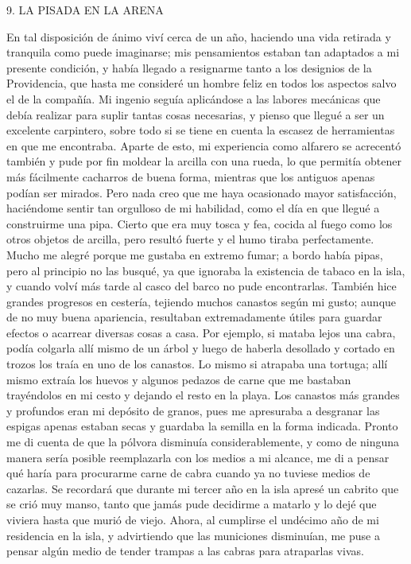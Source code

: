\documentclass{novela}
\begin{document}
    9. LA PISADA EN LA ARENA




    En tal disposición de ánimo viví cerca de un año, haciendo una vida retirada y tranquila como puede imaginarse; mis pensamientos estaban tan adaptados a mi presente condición, y había llegado a resignarme tanto a los designios de la Providencia, que hasta me consideré un hombre feliz en todos los aspectos salvo el de la compañía.
    Mi ingenio seguía aplicándose a las labores mecánicas que debía realizar para suplir tantas cosas necesarias, y pienso que llegué a ser un excelente carpintero, sobre todo si se tiene en cuenta la escasez de herramientas en que me encontraba. Aparte de esto, mi experiencia como alfarero se acrecentó también y pude por fin moldear la arcilla con una rueda, lo que permitía obtener más fácilmente cacharros de buena forma, mientras que los antiguos apenas podían ser mirados. Pero nada creo que me haya ocasionado mayor satisfacción, haciéndome sentir tan orgulloso de mi habilidad, como el día en que llegué a construirme una pipa. Cierto que era muy tosca y fea, cocida al fuego como los otros objetos de arcilla, pero resultó fuerte y el humo tiraba perfectamente. Mucho me alegré porque me gustaba en extremo fumar; a bordo había pipas, pero al principio no las busqué, ya que ignoraba la existencia de tabaco en la isla, y cuando volví más tarde al casco del barco no pude encontrarlas.
    También hice grandes progresos en cestería, tejiendo muchos canastos según mi gusto; aunque de no muy buena apariencia, resultaban extremadamente útiles para guardar efectos o acarrear diversas cosas a casa. Por ejemplo, si mataba lejos una cabra, podía colgarla allí mismo de un árbol y luego de haberla desollado y cortado en trozos los traía en uno de los canastos. Lo mismo si atrapaba una tortuga; allí mismo extraía los huevos y algunos pedazos de carne que me bastaban trayéndolos en mi cesto y dejando el resto en la playa. Los canastos más grandes y profundos eran mi depósito de granos, pues me apresuraba a desgranar las espigas apenas estaban secas y guardaba la semilla en la forma indicada.
    Pronto me di cuenta de que la pólvora disminuía considerablemente, y como de ninguna manera sería posible reemplazarla con los medios a mi alcance, me di a pensar qué haría para procurarme carne de cabra cuando ya no tuviese medios de cazarlas. Se recordará que durante mi tercer año en la isla apresé un cabrito que se crió muy manso, tanto que jamás pude decidirme a matarlo y lo dejé que viviera hasta que murió de viejo. Ahora, al cumplirse el undécimo año de mi residencia en la isla, y advirtiendo que las municiones disminuían, me puse a pensar algún medio de tender trampas a las cabras para atraparlas vivas.
\end{document}
